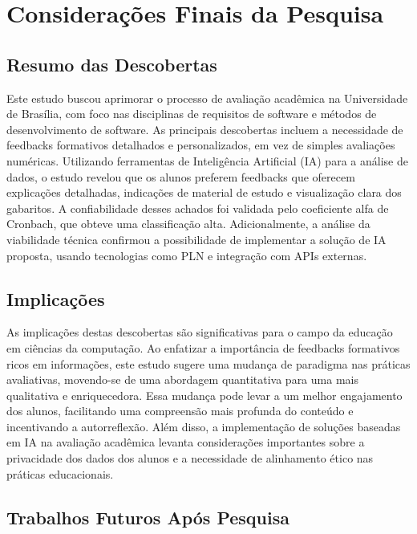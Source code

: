 \chapter{Considerações Finais da Pesquisa}

\section{Resumo das Descobertas}

Este estudo buscou aprimorar o processo de avaliação acadêmica na Universidade de Brasília, com foco nas disciplinas de requisitos de software e métodos de desenvolvimento de software. As principais descobertas incluem a necessidade de feedbacks formativos detalhados e personalizados, em vez de simples avaliações numéricas. Utilizando ferramentas de Inteligência Artificial (IA) para a análise de dados, o estudo revelou que os alunos preferem feedbacks que oferecem explicações detalhadas, indicações de material de estudo e visualização clara dos gabaritos. A confiabilidade desses achados foi validada pelo coeficiente alfa de Cronbach, que obteve uma classificação alta. Adicionalmente, a análise da viabilidade técnica confirmou a possibilidade de implementar a solução de IA proposta, usando tecnologias como PLN e integração com APIs externas.

\section{Implicações}

As implicações destas descobertas são significativas para o campo da educação em ciências da computação. Ao enfatizar a importância de feedbacks formativos ricos em informações, este estudo sugere uma mudança de paradigma nas práticas avaliativas, movendo-se de uma abordagem quantitativa para uma mais qualitativa e enriquecedora. Essa mudança pode levar a um melhor engajamento dos alunos, facilitando uma compreensão mais profunda do conteúdo e incentivando a autorreflexão. Além disso, a implementação de soluções baseadas em IA na avaliação acadêmica levanta considerações importantes sobre a privacidade dos dados dos alunos e a necessidade de alinhamento ético nas práticas educacionais.

\section{Trabalhos Futuros Após Pesquisa}

